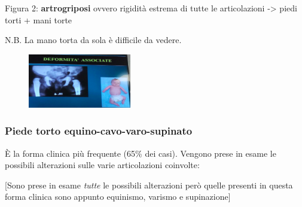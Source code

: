 Figura 2: \textbf{artrogriposi} ovvero rigidità estrema di tutte le articolazioni -> piedi torti + mani torte

N.B. La mano torta da sola è difficile da vedere.

\begin{figure}[!ht]
\centering
\includegraphics[width=0.4\textwidth]{016/image3.png}
\end{figure}

\subsubsection{Piede torto equino-cavo-varo-supinato}

È la forma clinica più frequente (65\% dei casi). Vengono prese in esame le possibili alterazioni sulle varie articolazioni coinvolte:

{[}Sono prese in esame \emph{tutte} le possibili alterazioni però quelle presenti in questa forma clinica sono appunto equinismo, varismo e supinazione{]}

